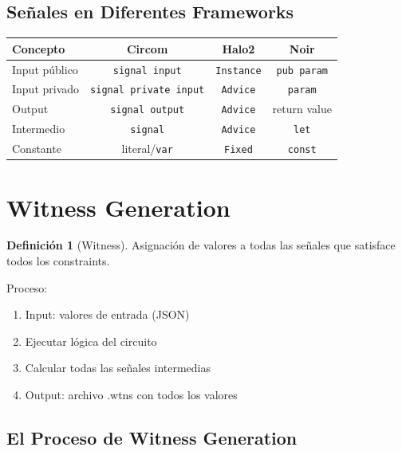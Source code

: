 \documentclass[11pt,a4paper,twoside,openright]{book}
\theoremstyle{definition}
\newtheorem{definition}{Definición}[chapter]
\theoremstyle{plain}
\theoremstyle{remark}
\begin{document}
\subsection{Señales en Diferentes Frameworks}

\begin{center}
\begin{tabular}{lccc}
\toprule
\textbf{Concepto} & \textbf{Circom} & \textbf{Halo2} & \textbf{Noir} \\
\midrule
Input público & \texttt{signal input} & \texttt{Instance} & \texttt{pub param} \\
Input privado & \texttt{signal private input} & \texttt{Advice} & \texttt{param} \\
Output & \texttt{signal output} & \texttt{Advice} & return value \\
Intermedio & \texttt{signal} & \texttt{Advice} & \texttt{let} \\
Constante & literal/\texttt{var} & \texttt{Fixed} & \texttt{const} \\
\bottomrule
\end{tabular}
\end{center}

\section{Witness Generation}

\begin{definition}[Witness]
Asignación de valores a todas las señales que satisface todos los constraints.
\end{definition}

Proceso:
\begin{enumerate}
    \item Input: valores de entrada (JSON)
    \item Ejecutar lógica del circuito
    \item Calcular todas las señales intermedias
    \item Output: archivo .wtns con todos los valores
\end{enumerate}

\subsection{El Proceso de Witness Generation}
\end{document}
